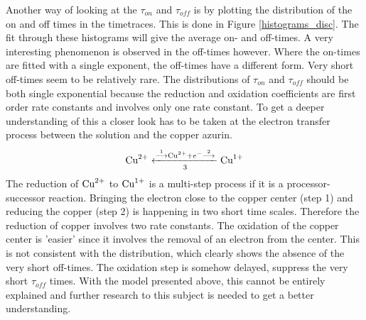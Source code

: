 \documentclass[twoside,single]{lion-msc}
\begin{document}
Another way of looking at the $\tau_{on}$ and  $\tau_{off}$ is by plotting the distribution of the on and off times in the timetraces. This is done in Figure \ref{histograms_disc}. The fit through these histograms will give the average on- and off-times. A very interesting phenomenon is observed in the off-times however. Where the on-times are fitted with a single exponent, the off-times have a different form. Very short off-times seem to be relatively rare. The distributions of  $\tau_{on}$ and  $\tau_{off}$ should be both single exponential because the reduction and oxidation coefficients are first order rate constants and involves only one rate constant.  To get a deeper understanding of this a closer look has to be taken at the electron transfer process between the solution and the copper azurin.
\begin{equation}\label{ox_pros}
\textup{Cu}^{2+}\xleftarrow[3]{\overset{1}{\longrightarrow}\textup{Cu}^{2+}+ e^{-}\overset{2}{\longrightarrow}}\textup{Cu}^{1+}
\end{equation}
The reduction of $\textup{Cu}^{2+}$ to $\textup{Cu}^{1+}$ is a multi-step process if it is a processor-successor reaction. Bringing the electron close to the copper center (step 1) and reducing the copper (step 2) is happening in two short time scales. Therefore the reduction of copper involves two rate constants. The oxidation of the copper center is 'easier' since it involves the removal of an electron from the center. This is not consistent with the distribution, which clearly shows the absence of the very short off-times. The oxidation step is somehow delayed, suppress the very short $\tau_{off}$ times. With the model presented above, this cannot be entirely explained and further research to this subject is needed to get a better understanding.
\end{document}
